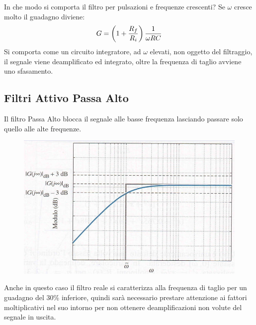 \documentclass[a4paper, 15pt]{article}
\begin{document}
\begin{adjustwidth}{2in}{}
   		In che modo si comporta il filtro per pulsazioni e frequenze crescenti? Se $\omega$ cresce molto il guadagno diviene: 
   		\[G = \left(1+{R_f\over R_i}\right){1\over \omega RC}\]
   		Si comporta come un circuito integratore, ad $\omega$ elevati, non oggetto del filtraggio, il segnale viene deamplificato ed integrato, oltre la frequenza di taglio avviene uno sfasamento.  
\end{adjustwidth}
\newpage
\subsection{Filtri Attivo Passa Alto}
\begin{adjustwidth}{2in}{}
   		Il filtro Passa Alto blocca il segnale alle basse frequenza lasciando passare solo quello alle alte frequenze.    		
   		\begin{figure}[H]
   			\centering
   			\includegraphics[width=0.5\linewidth]{immagini/screenshot003}
   			\label{fig:screenshot003}
   		\end{figure}   		
   		Anche in questo caso il filtro reale si caratterizza alla frequenza di taglio per un guadagno del 30\% inferiore, quindi sarà necessario prestare attenzione ai fattori   moltiplicativi nel suo intorno per non ottenere deamplificazioni non volute del segnale in uscita. 
   		

\end{adjustwidth}
\end{document}
